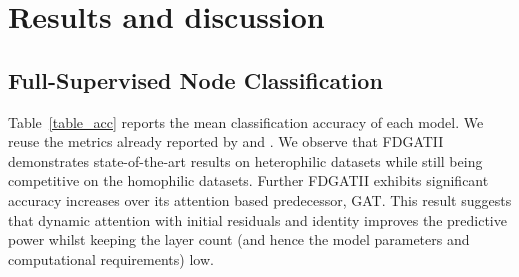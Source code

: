 \documentclass{article}
\begin{document}
\begin{table*} [!htbp]    \caption{Ablation study with and without II (Initial residual and Identity mapping). * Indicates the variant defined in Equation~\ref{eq-GCNII} and ** is from Equation~\ref{eq-GCNII2}. Each dataset is compared with the same hyperparameter settings (dropout, learning rate, decay) as in \citet{chen2020simple}. $L1$ and $L2$ identifies 1 and 2 layers respectively.}
\end{table*}

\section{Results and discussion}
\subsection{Full-Supervised Node Classification}
Table~\ref{table_acc} reports the mean classification accuracy of each model. We reuse the metrics already reported by \citet{chen2020simple} and \cite{zhu2020beyond}. We observe that FDGATII demonstrates state-of-the-art results on heterophilic datasets while still being competitive on the homophilic datasets. Further FDGATII exhibits significant accuracy increases over its attention based predecessor, GAT. This result suggests that dynamic attention with initial residuals and identity improves the predictive power whilst keeping the layer count (and hence the model parameters and computational requirements) low. 
\end{document}

